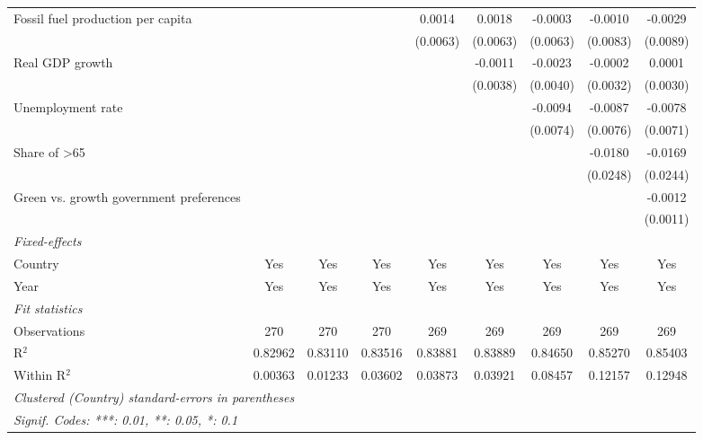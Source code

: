 \begin{table}[htbp]
\begin{tabular}{lcccccccc}
      Fossil fuel production per capita       &          &          &          & 0.0014   & 0.0018   & -0.0003  & -0.0010  & -0.0029\\   
                                              &          &          &          & (0.0063) & (0.0063) & (0.0063) & (0.0083) & (0.0089)\\   
      Real GDP growth                         &          &          &          &          & -0.0011  & -0.0023  & -0.0002  & 0.0001\\   
                                              &          &          &          &          & (0.0038) & (0.0040) & (0.0032) & (0.0030)\\   
      Unemployment rate                       &          &          &          &          &          & -0.0094  & -0.0087  & -0.0078\\   
                                              &          &          &          &          &          & (0.0074) & (0.0076) & (0.0071)\\   
      Share of >65                            &          &          &          &          &          &          & -0.0180  & -0.0169\\   
                                              &          &          &          &          &          &          & (0.0248) & (0.0244)\\   
      Green vs. growth government preferences &          &          &          &          &          &          &          & -0.0012\\   
                                              &          &          &          &          &          &          &          & (0.0011)\\   
      \midrule
      \emph{Fixed-effects}\\
      Country                                 & Yes      & Yes      & Yes      & Yes      & Yes      & Yes      & Yes      & Yes\\  
      Year                                    & Yes      & Yes      & Yes      & Yes      & Yes      & Yes      & Yes      & Yes\\  
      \midrule
      \emph{Fit statistics}\\
      Observations                            & 270      & 270      & 270      & 269      & 269      & 269      & 269      & 269\\  
      R$^2$                                   & 0.82962  & 0.83110  & 0.83516  & 0.83881  & 0.83889  & 0.84650  & 0.85270  & 0.85403\\  
      Within R$^2$                            & 0.00363  & 0.01233  & 0.03602  & 0.03873  & 0.03921  & 0.08457  & 0.12157  & 0.12948\\  
      \midrule \midrule
      \multicolumn{9}{l}{\emph{Clustered (Country) standard-errors in parentheses}}\\
      \multicolumn{9}{l}{\emph{Signif. Codes: ***: 0.01, **: 0.05, *: 0.1}}\\
   \end{tabular}
\end{table}



